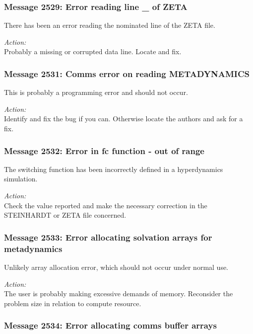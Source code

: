 \subsubsection*{Message 2529: Error reading line \_ of ZETA}

There has been an error reading the nominated line of the ZETA file.

\noindent
{\em Action:}\\ Probably a missing or corrupted data line. Locate and fix.
          
\subsubsection*{Message 2531: Comms error on reading METADYNAMICS}
          
This is probably a programming error and should not occur.

\noindent
{\em Action:}\\ Identify and fix the bug if you can. Otherwise locate
the authors and ask for a fix.

\subsubsection*{Message 2532: Error in fc function - out of range}

The switching function has been incorrectly defined in a hyperdynamics
simulation. 

\noindent
{\em Action:}\\ Check the value reported and make the necessary correction in
the STEINHARDT or ZETA file concerned.
          
\subsubsection*{Message 2533: Error allocating solvation arrays for 
metadynamics}

Unlikely array allocation error, which should not occur under normal use.

\noindent
{\em Action:}\\ The user is probably making excessive demands of
memory. Reconsider the problem size in relation to compute resource.
          
\subsubsection*{Message 2534: Error allocating comms buffer arrays}

